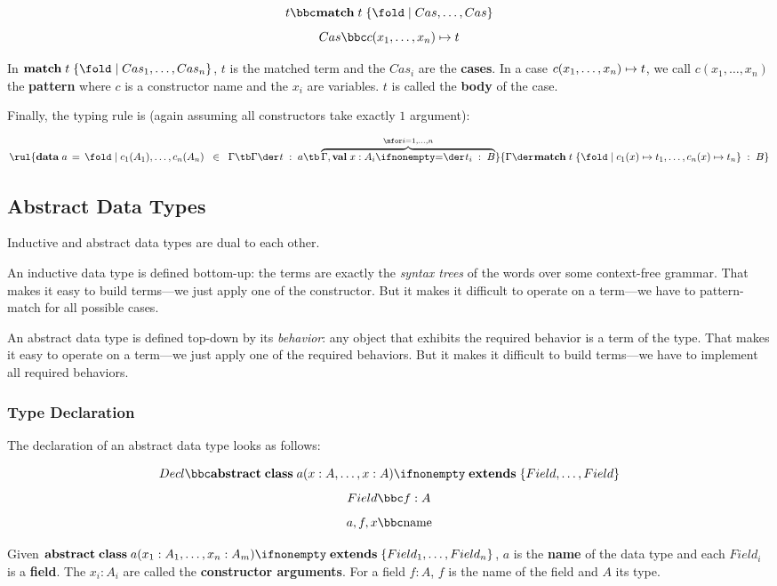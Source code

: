 \[t \bbc \amatchI{t}{Cas,\ldots,Cas}\]
\[Cas \bbc \acase{c(x_1,\ldots,x_n)}{t}\]

In $\amatchI{t}{Cas_1,\ldots,Cas_n}$, $t$ is the matched term and the $Cas_i$ are the \textbf{cases}.
In a case $c(x_1,\ldots,x_n) \mapsto t$, we call $c(x_1,\ldots,x_n)$ the \textbf{pattern} where $c$ is a constructor name and the $x_i$ are variables.
$t$ is called the \textbf{body} of the case.

Finally, the typing rule is (again assuming all constructors take exactly $1$ argument): 

\[\rul{\adata{a}{c_1(A_1),\ldots,c_n(A_n)}\;\;\in\;\;\Gamma \tb \oftype{}{\Gamma}{t}{a}\tb
       \overbrace{\oftype{}{\Gamma,\aval{x}{A_i}{}}{t_i}{B}}^{\mfor i=1,\ldots,n}}
      {\oftype{}{\Gamma}{\amatchI{t}{\acase{c_1(x)}{t_1},\ldots,\acase{c_n(x)}{t_n}}}{B}}\]


\subsection{Abstract Data Types}\label{sec:typetheory:adt}

Inductive and abstract data types are dual to each other.

An inductive data type is defined bottom-up: the terms are exactly the \emph{syntax trees} of the words over some context-free grammar.
That makes it easy to build terms---we just apply one of the constructor.
But it makes it difficult to operate on a term---we have to pattern-match for all possible cases.

An abstract data type is defined top-down by its \emph{behavior}: any object that exhibits the required behavior is a term of the type.
That makes it easy to operate on a term---we just apply one of the required behaviors.
But it makes it difficult to build terms---we have to implement all required behaviors.

\subsubsection{Type Declaration}

The declaration of an abstract data type looks as follows:

\[Decl \bbc \aclassAI{a}{x:A,\ldots,x:A}{}{Field,\ldots,Field}\]
\[Field \bbc f:A\]
\[a,f,x \bbc \text{name} \]

Given $\aclassAI{a}{x_1:A_1,\ldots,x_n:A_m}{}{Field_1,\ldots,Field_n}$, $a$ is the \textbf{name} of the data type and each $Field_i$ is a \textbf{field}.
The $x_i:A_i$ are called the \textbf{constructor arguments}.
For a field $f:A$, $f$ is the name of the field and $A$ its type.

